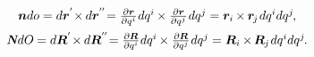 \nopagebreak\vspace{-0.1em}\en{\vspace{-0.32em}}
\begin{equation}\label{areavectorascrossproduct}
\begin{array}{c}
\bm{n} do = d \bm{r}^{'} \hspace{-0.5ex} \times \hspace{-0.1ex} d \bm{r}^{''} \hspace{-0.5ex}
= \frac{\partial \bm{r}}{\partial q^i} \hspace{.1ex} d q^i \hspace{-0.12ex} \times \frac{\partial \bm{r}}{\partial q^{j}} \hspace{.16ex} d q^{j}
= \bm{r}_i \hspace{-0.16ex} \times \hspace{-0.1ex} \bm{r}_{\hspace{-0.2ex}j} \hspace{0.2ex} dq^{i} dq^{j} \hspace{-0.2ex}, \\[.64em]
%
\mathboldN dO \hspace{-0.1ex} = d \bm{R}^{'} \hspace{-0.4ex} \times \hspace{-0.1ex} d \bm{R}^{''} \hspace{-0.5ex}
= \frac{\partial \bm{R}}{\partial q^i} \hspace{.1ex} d q^i \hspace{-0.12ex} \times \frac{\partial \bm{R}}{\partial q^{j}} \hspace{.16ex} d q^{j}
= \bm{R}_i \hspace{-0.1ex} \times \hspace{-0.2ex} \bm{R}_{\hspace{-0.1ex}j} \hspace{0.2ex} dq^{i} dq^{j} \hspace{-0.2ex}.
\end{array}
\end{equation}



